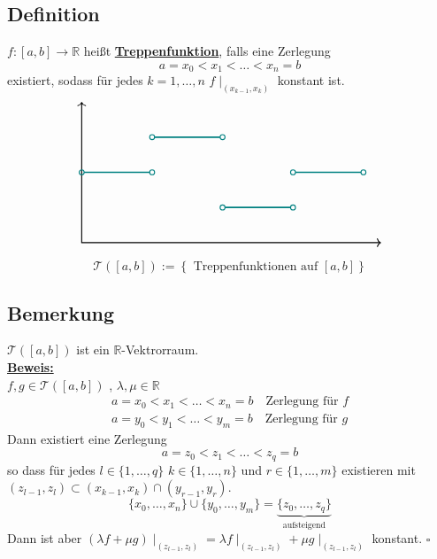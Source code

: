 \subsection{Definition} %
\label{sub:definition}
$f: [a,b] \to \mathds{R}$ heißt \underline{\textbf{Treppenfunktion}}, falls eine Zerlegung 
\[
	a = x_0 < x_1 < \ldots  < x_n = b
\]
existiert, sodass für jedes $k= 1, \ldots , n$ $f \mid_{(x_{k-1} , x_k)}$ konstant ist.
\[
	\begin{tikzpicture}
		\draw [<->, thick] (8.5,0) -- (0,0) -- (0,4);
		\draw [teal, thick] (0,2) circle [radius= 0.07];
		\draw [teal, very thick] (0.07,2) -- (1.93,2);
		\draw [teal, thick] (2,3) circle [radius= 0.07];
		\draw [teal, thick] (2,2) circle [radius= 0.07];
		\draw [teal, thick] (4,3) circle [radius= 0.07];
		\draw [teal, thick] (4,1) circle [radius= 0.07];
		\draw [teal, thick] (6,1) circle [radius= 0.07];
		\draw [teal, thick] (6,2) circle [radius= 0.07];
		\draw [teal, thick] (8,2) circle [radius= 0.07];
		\draw [teal, very thick] (2.07,3) -- (3.93,3);
		\draw [teal, very thick] (4.07,1) -- (5.93,1);
		\draw [teal, very thick] (6.07,2) -- (7.93,2);
	\end{tikzpicture}
\]
\[
	\mathcal{T} ([a,b]) := \left\{ \text{ Treppenfunktionen auf } [a,b] \right\}
\]

\subsection{Bemerkung} %
\label{sub:bemerkung}
$\mathcal{T} ( [a,b])$ ist ein $\mathds{R}$-Vektrorraum.
\vspace{10pt} \\
\underline{\textbf{Beweis:}} \\
$f,g \in \mathcal{T} ([a,b])$ , $\lambda , \mu \in \mathds{R}$
\begin{gather*}
	a = x_0 < x_1 < \ldots < x_n = b \quad \text{Zerlegung für }f \\
	a = y_0 < y_1 < \ldots < y_m = b \quad \text{Zerlegung für }g
\end{gather*}
Dann existiert eine Zerlegung 
\[
	a= z_0 < z_1 < \ldots < z_q = b
\]
so dass für jedes $l \in \{1, \ldots , q \}$ $k \in \{1, \ldots , n\}$ und $r \in \{1, \ldots , m \}$ existieren mit $(z_{l-1}, z_l) \subset (x_{k-1}, x_k) \cap (y_{r-1}, y_r)$.
\[
	\{x_0, \ldots , x_n \} \cup \{y_0, \ldots , y_m \}=  \underbrace{ \{ z_0, \ldots , z_q \} }_{\text{aufsteigend}}
\]
Dann ist aber $(\lambda f + \mu g)\mid_{(z_{l-1}, z_l)} = \lambda f \mid_{(z_{l-1}, z_l)} + \mu g\mid_{(z_{l-1}, z_l)}$ konstant. \hfill \( \square \)

